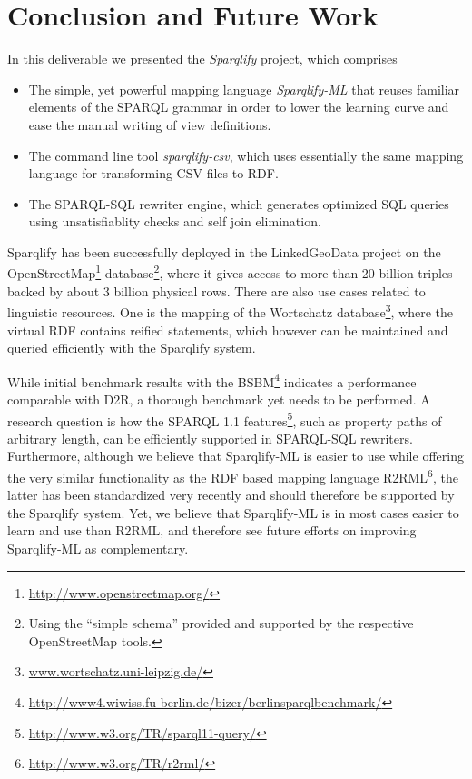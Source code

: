\documentclass[a4paper,twoside,bibtotoc,abstracton,12pt,BCOR=15mm]{scrreprt}
\newcommand{\todo}[1]{\textbf{ToDo: \textit{#1}}}
\begin{document}
\section{Conclusion and Future Work}
In this deliverable we presented the \emph{Sparqlify} project, which comprises
\begin{itemize}
  \item The simple, yet powerful mapping language \emph{Sparqlify-ML} that reuses familiar elements of the SPARQL grammar
  in order to lower the learning curve and ease the manual writing of view definitions.
  \item The command line tool \emph{sparqlify-csv}, which uses essentially the same mapping language for transforming CSV files to RDF. 
  \item The SPARQL-SQL rewriter engine, which generates optimized SQL queries using unsatisfiablity checks and self join elimination.   
\end{itemize}

Sparqlify has been successfully deployed in the LinkedGeoData project on the
OpenStreetMap\footnote{\url{http://www.openstreetmap.org/}}
database\footnote{Using the ``simple schema'' provided and supported by the respective OpenStreetMap tools.},
where it gives access to more than 20 billion triples backed by about 3 billion physical rows.
There are also use cases related to linguistic resources.
One is the mapping of the Wortschatz database\footnote{\url{www.wortschatz.uni-leipzig.de/}}, where the virtual RDF contains reified statements, which however can be maintained and queried efficiently with the Sparqlify system.


While initial benchmark results with the BSBM\footnote{\url{http://www4.wiwiss.fu-berlin.de/bizer/berlinsparqlbenchmark/}} indicates a performance comparable with D2R, a thorough benchmark yet needs to be performed.
A research question is how the SPARQL 1.1 features\footnote{\url{http://www.w3.org/TR/sparql11-query/}}, such as property paths of arbitrary length, can be efficiently supported in SPARQL-SQL rewriters.
Furthermore, although we believe that Sparqlify-ML is easier to use while offering the very similar functionality as the RDF based mapping language R2RML\footnote{\url{http://www.w3.org/TR/r2rml/}},
the latter has been standardized very recently and should therefore be supported by the Sparqlify system. Yet, we believe that
Sparqlify-ML is in most cases easier to learn and use than R2RML, and therefore see future efforts on improving Sparqlify-ML as complementary. 
\end{document}
